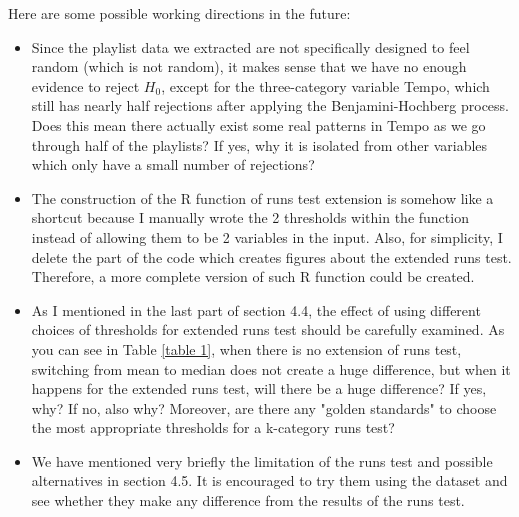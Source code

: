\documentclass[12pt]{article}
\theoremstyle{plain}
\theoremstyle{definition}
\theoremstyle{remark}
\begin{document}
Here are some possible working directions in the future:
\begin{itemize}
    \item Since the playlist data we extracted are not specifically designed to feel random (which is not random), it makes sense that we have no enough evidence to reject $H_0$, except for the three-category variable Tempo, which still has nearly half rejections after applying the Benjamini-Hochberg process. Does this mean there actually exist some real patterns in Tempo as we go through half of the playlists? If yes, why it is isolated from other variables which only have a small number of rejections?
    \item The construction of the R function of runs test extension is somehow like a shortcut because I manually wrote the 2 thresholds within the function instead of allowing them to be 2 variables in the input. Also, for simplicity, I delete the part of the code which creates figures about the extended runs test. Therefore, a more complete version of such R function could be created.
    \item As I mentioned in the last part of section 4.4, the effect of using different choices of thresholds for extended runs test should be carefully examined. As you can see in Table \ref{table 1}, when there is no extension of runs test, switching from mean to median does not create a huge difference, but when it happens for the extended runs test, will there be a huge difference? If yes, why? If no, also why? Moreover, are there any "golden standards" to choose the most appropriate thresholds for a k-category runs test? 
    \item We have mentioned very briefly the limitation of the runs test and possible alternatives in section 4.5. It is encouraged to try them using the dataset and see whether they make any difference from the results of the runs test.
\end{itemize}
\end{document}
